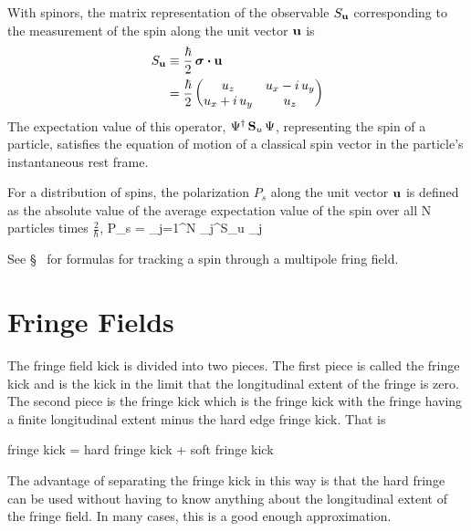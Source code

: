 With spinors, the matrix representation of the observable $S_{{\bf u}}$
corresponding to the measurement of the spin along the unit vector
${\bf u}$ is
\begin{align}
  S_{{\bf u}} &\equiv \frac{\hbar}{2} \, \boldsymbol{\sigma} \mathbin{\boldsymbol{\cdot}} {\bf u} \\   
            &= \frac{\hbar}{2} 
                   \begin{pmatrix} 
                     u_z            & u_x - i \, u_y \\
                     u_x + i \, u_y & u_z
                   \end{pmatrix}
\end{align}
The expectation value of this operator, $\Psi^\dagger \, {\bf S}_u \,
\Psi$, representing the spin of a particle, satisfies the equation of
motion of a classical spin vector in the particle's instantaneous rest
frame.

For a distribution of spins, the polarization $P_s$ along the unit
vector ${\bf u}$ is defined as the absolute value of the average
expectation value of the spin over all N particles times
$\frac{2}{\hbar}$,
  \Begineq
    P_s =   \sum_{j=1}^{N} \Psi_j^\dagger S_{\Bf u} \Psi_j
  \Endeq  

See \S~ for formulas for tracking a spin through a multipole
fring field.

\section{Fringe Fields}
\label{s:fringe.std}

The fringe field kick is divided into two pieces. 
The first piece is called the  fringe kick and is the kick in the limit
that the longitudinal extent of the fringe is zero. The second piece is the 
 fringe kick which is the fringe kick with the fringe having a finite
longitudinal extent minus the hard edge fringe kick. That is
\begin{example}
  fringe kick = hard fringe kick + soft fringe kick
\end{example}
The advantage of separating the fringe kick in this way is that the hard fringe can
be used without having to know anything about the longitudinal extent of the fringe
field. In many cases, this is a good enough approximation. 

